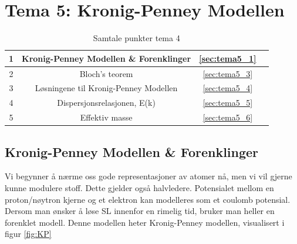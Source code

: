 \section{Tema 5: Kronig-Penney Modellen}
\label{tema5}

\begin{table}[!htb]
    \centering
    \caption{Samtale punkter tema 4}
    \begin{tabular}{|c|c|c|r|}
      \hline
      1 & Kronig-Penney Modellen \& Forenklinger &  \autoref{sec:tema5_1} & \cellcolor{blue}\quad\quad \\
      \hline 
      2 & Bloch's teorem & \autoref{sec:tema5_3} & \cellcolor{blue} \\
      \hline
      3 & Løsningene til Kronig-Penney Modellen & \autoref{sec:tema5_4} & \cellcolor{blue} \\
      \hline 
      4 & Dispersjonsrelasjonen, E(k) & \autoref{sec:tema5_5} & \cellcolor{blue} \\
      \hline
      5 & Effektiv masse & \autoref{sec:tema5_6} & \cellcolor{blue} \\ 
      \hline
    \end{tabular}
    \label{tab:samtalePunkt_tema1}
\end{table}

\subsection{Kronig-Penney Modellen \& Forenklinger}
\label{sec:tema5_1}
Vi begynner å nærme oss gode representasjoner av atomer nå, men vi vil gjerne kunne modulere stoff. Dette gjelder også halvledere. Potensialet mellom en proton/nøytron kjerne og et elektron kan modelleres som et coulomb potensial. Dersom man ønsker å løse SL innenfor en rimelig tid, bruker man heller en forenklet modell. Denne modellen heter Kronig-Penney modellen, visualisert i figur \ref{fig:KP}

